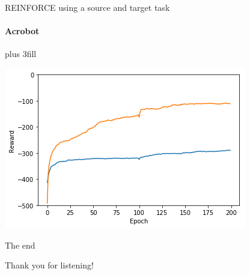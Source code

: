\documentclass{beamer}
\begin{document}
\begin{frame}[fragile]{REINFORCE using a source and target task}
\framesubtitle{Acrobot}
\vskip0pt plus 3fill
\begin{center}
    \includegraphics[width=.8\linewidth]{results/Acrobot/reinforce_2tasks.png}
\end{center}
\end{frame}

\begin{frame}[c]{The end}
\begin{center}
    \color{vubbleu} \LARGE\vubfont Thank you for listening!
\end{center}
\end{frame}
\end{document}
